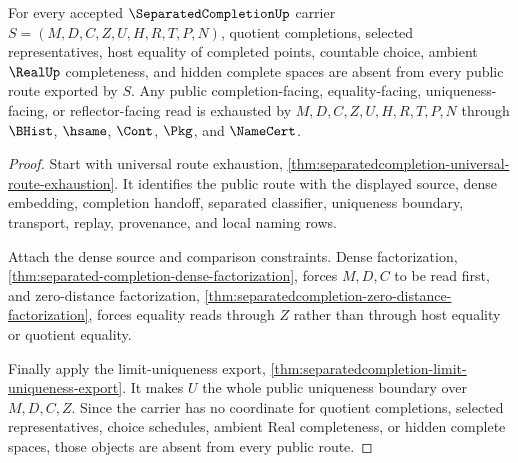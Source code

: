 \begin{theorem}
\label{thm:separatedcompletion-no-quotient-exhaustion}
For every accepted $\SeparatedCompletionUp$ carrier $S=(M,D,C,Z,U,H,R,T,P,N)$, quotient completions, selected representatives, host equality of completed points, countable choice, ambient $\RealUp$ completeness, and hidden complete spaces are absent from every public route exported by $S$. Any public completion-facing, equality-facing, uniqueness-facing, or reflector-facing read is exhausted by $M,D,C,Z,U,H,R,T,P,N$ through $\BHist$, $\hsame$, $\Cont$, $\Pkg$, and $\NameCert$.
\end{theorem}
\begin{proof}
Start with universal route exhaustion, \autoref{thm:separatedcompletion-universal-route-exhaustion}. It identifies the public route with the displayed source, dense embedding, completion handoff, separated classifier, uniqueness boundary, transport, replay, provenance, and local naming rows.

Attach the dense source and comparison constraints. Dense factorization, \autoref{thm:separated-completion-dense-factorization}, forces $M,D,C$ to be read first, and zero-distance factorization, \autoref{thm:separatedcompletion-zero-distance-factorization}, forces equality reads through $Z$ rather than through host equality or quotient equality.

Finally apply the limit-uniqueness export, \autoref{thm:separatedcompletion-limit-uniqueness-export}. It makes $U$ the whole public uniqueness boundary over $M,D,C,Z$. Since the carrier has no coordinate for quotient completions, selected representatives, choice schedules, ambient Real completeness, or hidden complete spaces, those objects are absent from every public route.
\end{proof}

